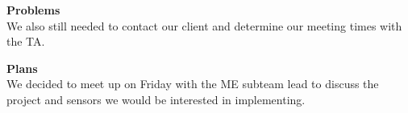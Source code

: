 \documentclass[onecolumn, oneside, letterpaper, draftclsnofoot, 10pt, compsoc]{IEEEtran}
\begin{document}
\noindent \textbf{Problems}\\ \noindent
We also still needed to contact our client and determine our meeting times with the TA.

\noindent \textbf{Plans}\\
We decided to meet up on Friday with the ME subteam lead to discuss the project and sensors we would be interested in implementing.

\end{document}
